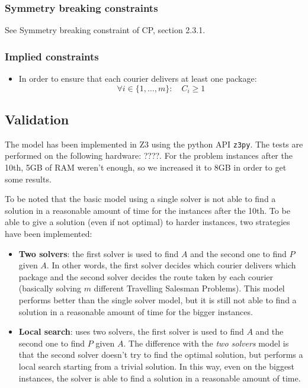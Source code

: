 \subsubsection{Symmetry breaking constraints}
See Symmetry breaking constraint of CP, section 2.3.1. 

\subsubsection{Implied constraints}

\begin{itemize}
    \item In order to ensure that each courier delivers at least one package:
    \begin{equation}
        \forall i \in \{1, \dots, m\}: \quad C_i \geq 1  
    \end{equation}
\end{itemize}


\subsection{Validation}

The model has been implemented in Z3 using the python API \texttt{z3py}. The tests are performed on the following hardware: ????. For the problem instances after the 10th, 5GB of RAM weren't enough, so we increased it to 8GB in order to get some results.

To be noted that the basic model using a single solver is not able to find a solution in a reasonable amount of time for the instances after the 10th. To be able to give a solution (even if not optimal) to harder instances, two strategies have been implemented:

\begin{itemize}
    \item \textbf{Two solvers}: the first solver is used to find $A$ and the second one to find $P$ given $A$. In other words, the first solver decides which courier delivers which package and the second solver decides the route taken by each courier (basically solving $m$ different Travelling Salesman Problems). This model performs better than the single solver model, but it is still not able to find a solution in a reasonable amount of time for the bigger instances.

    \item \textbf{Local search}: uses two solvers, the first solver is used to find $A$ and the second one to find $P$ given $A$. The difference with the \textit{two solvers} model is that the second solver doesn't try to find the optimal solution, but performs a local search starting from a trivial solution. In this way, even on the biggest instances, the solver is able to find a solution in a reasonable amount of time.

\end{itemize}




